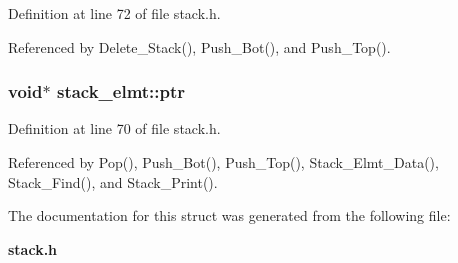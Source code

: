 Definition at line 72 of file stack.h.

Referenced by Delete\_\-Stack(), Push\_\-Bot(), and Push\_\-Top().
\subsubsection{\setlength{\rightskip}{0pt plus 5cm}void$\ast$ \bf{stack\_\-elmt::ptr}}\label{structstack__elmt_dbbddf9856560c64a0dbb2486e6c52e3}




Definition at line 70 of file stack.h.

Referenced by Pop(), Push\_\-Bot(), Push\_\-Top(), Stack\_\-Elmt\_\-Data(), Stack\_\-Find(), and Stack\_\-Print().

The documentation for this struct was generated from the following file:\begin{CompactItemize}
\item 
\bf{stack.h}\end{CompactItemize}

